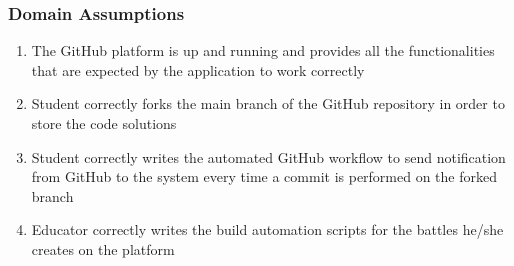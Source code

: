\subsubsection{Domain Assumptions}
\begin{enumerate}[label=D\arabic*]
		\item The GitHub platform is up and running and provides all the functionalities that are expected by the application to work correctly
		\item Student correctly forks the main branch of the GitHub repository in order to store the code solutions
		\item Student correctly writes the automated GitHub workflow to send notification from GitHub to the system every time a commit is performed on the forked branch
		\item Educator correctly writes the build automation scripts for the battles he/she creates on the platform
	\end{enumerate}